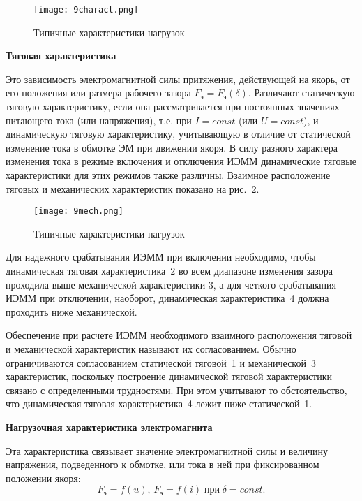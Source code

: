 \begin{figure}[h!]
	\caption{ Типичные характеристики нагрузок }
	\texttt{[image: 9charact.png]}
	\label{pic:9charact}
\end{figure}

\begin{flushleft}
\textbf{Тяговая характеристика}
\end{flushleft}
Это зависимость электромагнитной силы притяжения, действующей на якорь, от его положения или размера рабочего зазора $ F_\text{э} = F_\text{э}(\delta) $. Различают статическую тяговую характеристику, если она рассматривается при постоянных значениях питающего тока (или напряжения), т.е. при $ I = const $ (или $ U = const $), и динамическую тяговую характеристику, учитывающую в отличие от статической изменение тока в обмотке ЭМ при движении якоря. В силу разного характера изменения тока в режиме включения и отключения ИЭММ динамические тяговые характеристики для этих режимов также различны. Взаимное расположение тяговых и механических характеристик показано на рис.~\ref{pic:9mech}.

\begin{figure}[h!]
	\caption{ Типичные характеристики нагрузок }
	\texttt{[image: 9mech.png]}
	\label{pic:9mech}
\end{figure}

Для надежного срабатывания ИЭММ при включении необходимо, чтобы динамическая тяговая характеристика~2 во всем диапазоне изменения зазора   проходила выше механической характеристики 3, а для четкого срабатывания ИЭММ при отключении, наоборот, динамическая характеристика~4 должна проходить ниже механической. 

Обеспечение при расчете ИЭММ необходимого взаимного расположения тяговой и механической характеристик называют их согласованием. Обычно ограничиваются согласованием статической тяговой~1 и механической~3 характеристик, поскольку построение динамической тяговой характеристики связано с определенными трудностями. При этом учитывают то обстоятельство, что динамическая тяговая характеристика~4 лежит ниже статической~1.

\begin{flushleft}
\textbf{Нагрузочная характеристика электромагнита}
\end{flushleft}
Эта характеристика связывает значение электромагнитной силы и величину напряжения, подведенного к обмотке, или тока в ней при фиксированном положении якоря:
\[ F_\text{э} = f(u),\, F_\text{э} = f(i)\;\text{при}\; \delta = const.\]

